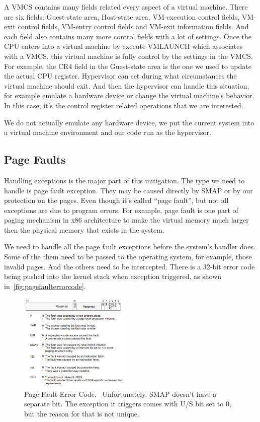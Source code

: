 A VMCS contains many fields related every aspect of a virtual machine. There are six fields: Guest-state area, Host-state area, VM-execution control fields, VM-exit control fields, VM-entry control fields and VM-exit information fields. And each field also contains many more control fields with a lot of settings. Once the CPU enters into a virtual machine by execute VMLAUNCH which associates with a VMCS, this virtual machine is fully control by the settings in the VMCS. For example, the CR4 field in the Guest-state area is the one we used to update the actual CPU register.  Hypervisor can set during what circumstances the virtual machine should exit. And then the hypervisor can handle this situation, for example emulate a hardware device or change the virtual machine's behavior. In this case, it's the control register related operations that we are interested. 

We do not actually emulate any hardware device, we put the current system into a virtual machine environment and our code run as the hypervisor.



\subsection{Page Faults}
Handling exceptions is the major part of this mitigation. The type we need to handle is page fault exception. They may be caused directly by SMAP or by our protection on the pages. Even though it's called ``page fault'', but not all exceptions are due to program errors. For example, page fault is one part of paging mechanism in x86 architecture to make the virtual memory much larger then the physical memory that exists in the system. 

We need to handle all the page fault exceptions before the system's handler does. Some of the them need to be passed to the operating system, for example, those invalid pages. And the others need to be intercepted. There is a 32-bit error code being pushed into the kernel stack when exception triggered, as shown in~\autoref{fig:pagefaulterrorcode}.


\begin{figure}[th]
  \includegraphics[width=0.47\textwidth]{figures/pagefaulterrorcode}
  \centering
  \caption{Page Fault Error Code.~\cite{intelinterrupt} Unfortunately, SMAP doesn't have a separate bit. The exception it triggers comes with U/S bit set to 0, but the reason for that is not unique.}
  \label{fig:pagefaulterrorcode}
\end{figure}


